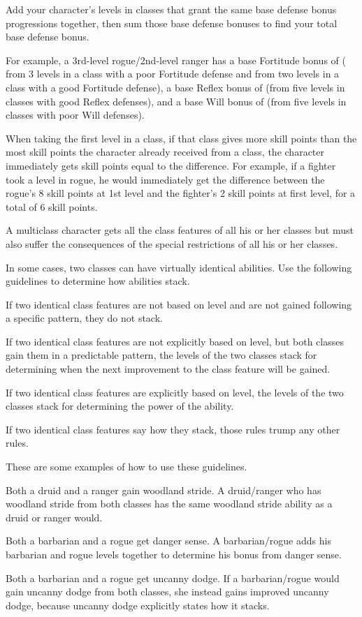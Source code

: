  Add your character's levels in classes that grant the same base defense bonus progressions together, then sum those base defense bonuses to find your total base defense bonus.

\par For example, a 3rd-level rogue/2nd-level ranger has a base Fortitude bonus of  ( from 3 levels in a class with a poor Fortitude defense and  from two levels in a class with a good Fortitude defense), a base Reflex bonus of  (from five levels in classes with good Reflex defenses), and a base Will bonus of  (from five levels in classes with poor Will defenses).

 When taking the first level in a class, if that class gives more skill points than the most skill points the character already received from a class, the character immediately gets skill points equal to the difference. For example, if a fighter took a level in rogue, he would immediately get the difference between the rogue's 8 skill points at 1st level and the fighter's 2 skill points at first level, for a total of 6 skill points.

 A multiclass character gets all the class features
of all his or her classes but must also suffer the consequences of the
special restrictions of all his or her classes.

\par In some cases, two classes can have virtually identical abilities.
Use the following guidelines to determine how abilities stack.
\begin{itemize*}
\item If two identical class features are not based on level and are not gained following a specific pattern, they do not stack.
\item If two identical class features are not explicitly based on level, but both classes gain them in a predictable pattern, the levels of the two classes stack for determining when the next improvement to the class feature will be gained.
\item If two identical class features are explicitly based on level, the levels of the two classes stack for determining the power of the ability.
\item If two identical class features say how they stack, those rules trump any other rules.
\end{itemize*}
These are some examples of how to use these guidelines.
\begin{itemize*}
\item Both a druid and a ranger gain woodland stride. A druid/ranger who has woodland stride from both classes has the same woodland stride ability as a druid or ranger would.
\item Both a barbarian and a rogue get danger sense. A barbarian/rogue adds his barbarian and rogue levels together to determine his bonus from danger sense.
\item Both a barbarian and a rogue get uncanny dodge. If a barbarian/rogue would gain uncanny dodge from both classes, she instead gains improved uncanny dodge, because uncanny dodge explicitly states how it stacks.
\end{itemize*}


